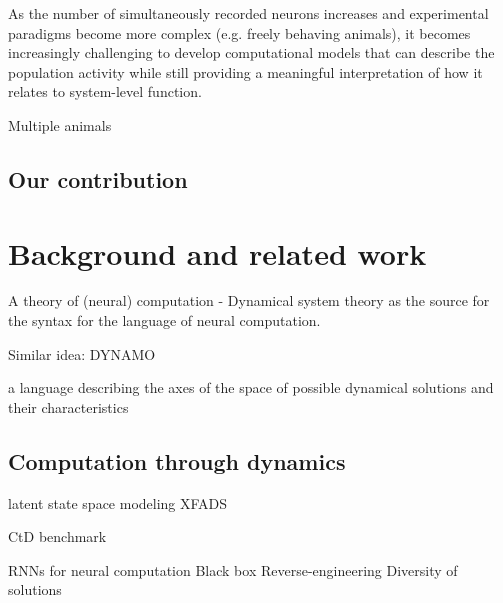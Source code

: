 \documentclass{article}
\theoremstyle{definition} \newtheorem{definition}{Definition}  \newtheorem{example}{Example}
\theoremstyle{remark} \newtheorem{remark}{Remark}
\newcounter{ct}
\begin{document}
 
 
 As the number of simultaneously recorded neurons increases and experimental paradigms become more complex (e.g. freely behaving animals), it becomes increasingly challenging to develop computational models that can describe the population activity while still providing a meaningful interpretation of how it relates to system-level function.


Multiple animals \citep{depasquale2021accumulation}


\subsection{Our contribution}\label{sec:contribution}




\section{Background and related work}\label{sec:background}
A theory of (neural) computation\citep{jaeger2021theory, jaeger2023timescales, jaeger2023theory}
- Dynamical system theory as the source for the syntax for the language of neural computation.

Similar idea: DYNAMO \citep{cotler2023analyzing}

a language describing the axes of the space of possible dynamical solutions and their characteristics \citep{pagan2022dm}

\subsection{Computation through dynamics}
\citep{mante2013context}
\citep{sussillo2014neural}
\citep{vyas2020ctd}
\citep{versteeg2023expressive, sedler2023expressive}
\citep{dinc2025latentcomputing}

latent state space modeling \citep{zoltowski2020general} 
XFADS\citep{Dowling2024b}

CtD benchmark \citep{versteeg2025computation}

RNNs for neural computation \citep{chaisangmongkon2017transience}
Black box \citep{sussillo2013blackbox}
Reverse-engineering \citep{maheswaranathan2019reverse} \citep{golub2018fixedpointfinder} \citep{smith2021reverse} \citep{rivkind2017local}
Diversity of solutions \citep{maheswaranathan2019universality}\citep{jarne2023initialization} \citep{turner2021charting} \citep{nayebi2021heterogeneity} \citep{zhong2023mechanistic}
\end{document}
